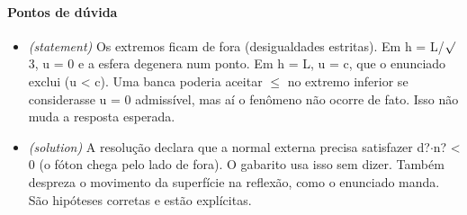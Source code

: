 \documentclass{article}%
\begin{document}
\paragraph{Pontos de dúvida}%
\begin{itemize}%
\item%
\textit{(statement)} Os extremos ficam de fora (desigualdades estritas). Em h = L/$\surd$3, u = 0 e a esfera degenera num ponto. Em h = L, u = c, que o enunciado exclui (u < c). Uma banca poderia aceitar $\leq$ no extremo inferior se considerasse u = 0 admissível, mas aí o fenômeno não ocorre de fato. Isso não muda a resposta esperada.%
\item%
\textit{(solution)} A resolução declara que a normal externa precisa satisfazer d?$\cdot$n? < 0 (o fóton chega pelo lado de fora). O gabarito usa isso sem dizer. Também despreza o movimento da superfície na reflexão, como o enunciado manda. São hipóteses corretas e estão explícitas.%
\end{itemize}%
\end{document}
